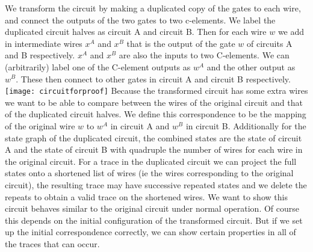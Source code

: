 \documentclass{article}
\begin{document}
We transform the circuit by making a duplicated copy of the gates to each wire, and connect the outputs of the two gates to two c-elements.  We label the duplicated circuit halves as circuit A and circuit B.  Then for each wire $w$ we add in intermediate wires $x^A$ and $x^B$ that is the output of the gate $w$ of circuits A and B respectively.  $x^A$ and $x^B$ are also the inputs to two C-elements.  We can (arbitrarily) label one of the C-element outputs as $w^A$ and the other output as $w^B$.  These then connect to other gates in circuit A and circuit B respectively. \newline
\texttt{[image: circuitforproof]}
Because the transformed circuit has some extra wires we want to be able to compare between the wires of the original circuit and that of the duplicated circuit halves.  We define this correspondence to be the mapping of the original wire $w$ to $w^A$ in circuit A and $w^B$ in circuit B.  Additionally for the state graph of the duplicated circuit, the combined states are the state of circuit A and the state of circuit B with quadruple the number of wires for each wire in the original circuit.  For a trace in the duplicated circuit we can project the full states onto a shortened list of wires (ie the wires corresponding to the original circuit), the resulting trace may have successive repeated states and we delete the repeats to obtain a valid trace on the shortened wires.  %
\newline
We want to show this circuit behaves similar to the original circuit under normal operation.  %
Of course this depends on the initial configuration of the transformed circuit.  But if we set up the initial correspondence correctly, we can show certain properties in all of the traces that can occur.  
\newline
\end{document}
